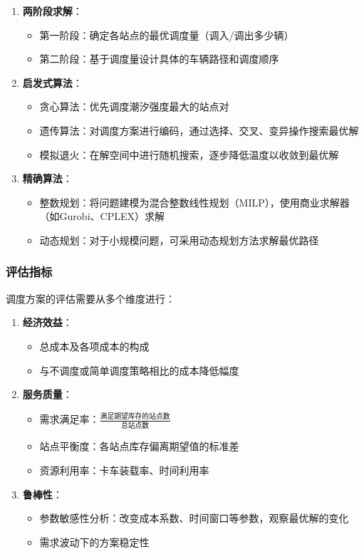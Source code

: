 \documentclass[12pt,a4paper]{ctexart}
\begin{document}
\begin{enumerate}
    \item \textbf{两阶段求解}：
    \begin{itemize}
        \item 第一阶段：确定各站点的最优调度量（调入/调出多少辆）
        \item 第二阶段：基于调度量设计具体的车辆路径和调度顺序
    \end{itemize}

    \item \textbf{启发式算法}：
    \begin{itemize}
        \item 贪心算法：优先调度潮汐强度最大的站点对
        \item 遗传算法：对调度方案进行编码，通过选择、交叉、变异操作搜索最优解
        \item 模拟退火：在解空间中进行随机搜索，逐步降低温度以收敛到最优解
    \end{itemize}

    \item \textbf{精确算法}：
    \begin{itemize}
        \item 整数规划：将问题建模为混合整数线性规划（MILP），使用商业求解器（如Gurobi、CPLEX）求解
        \item 动态规划：对于小规模问题，可采用动态规划方法求解最优路径
    \end{itemize}
\end{enumerate}

\subsubsection{评估指标}

调度方案的评估需要从多个维度进行：

\begin{enumerate}
    \item \textbf{经济效益}：
    \begin{itemize}
        \item 总成本及各项成本的构成
        \item 与不调度或简单调度策略相比的成本降低幅度
    \end{itemize}

    \item \textbf{服务质量}：
    \begin{itemize}
        \item 需求满足率：$\frac{\text{满足期望库存的站点数}}{\text{总站点数}}$
        \item 站点平衡度：各站点库存偏离期望值的标准差
        \item 资源利用率：卡车装载率、时间利用率
    \end{itemize}

    \item \textbf{鲁棒性}：
    \begin{itemize}
        \item 参数敏感性分析：改变成本系数、时间窗口等参数，观察最优解的变化
        \item 需求波动下的方案稳定性
    \end{itemize}
\end{enumerate}
\end{document}
